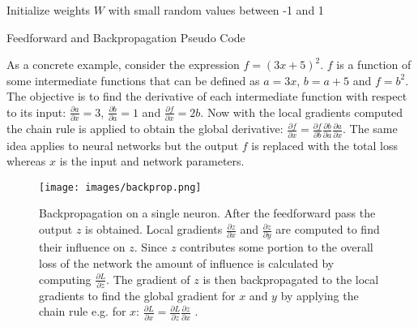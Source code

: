 \documentclass[12pt]{report}
\begin{document}
\begin{algorithm}[H]
\SetAlgoLined
 Initialize weights $W$ with small random values between -1 and 1\;
\caption{Feedforward and Backpropagation Pseudo Code}
\end{algorithm}


As a concrete example, consider the expression $f=(3x+5)^2$.  $f$ is a function of some intermediate functions that can be defined as $a=3x$, $b=a+5$ and $f=b^2$.  The objective is to find the derivative of each intermediate function with respect to its input: $\frac{\partial{a}}{\partial{x}}=3$, $\frac{\partial{b}}{\partial{a}}=1$ and $\frac{\partial{f}}{\partial{x}}=2b$.  Now with the local gradients computed the chain rule is applied to obtain the global derivative: $\frac{\partial{f}}{\partial{x}}= \frac{\partial{f}}{\partial{b}} \frac{\partial{b}}{\partial{a}} \frac{\partial{a}}{\partial{x}}$.  The same idea applies to neural networks but the output $f$ is replaced with the total loss whereas $x$ is the input and network parameters.

\begin{figure}[H]
\centering
\texttt{[image: images/backprop.png]}
\caption[Backpropagation on a single neuron] {Backpropagation on a single neuron. After the feedforward pass the output $z$ is obtained.  Local gradients $\frac{\partial{z}}{\partial{x}}$ and $\frac{\partial{z}}{\partial{y}}$ are computed to find their influence on $z$. Since $z$ contributes some portion to the overall loss of the network the amount of influence is calculated by computing $\frac{\partial{L}}{\partial{z}}$.  The gradient of $z$ is then backpropagated to the local gradients to find the global gradient for $x$ and $y$ by applying the chain rule e.g. for $x$: $\frac{\partial{L}}{\partial{x}} = \frac{\partial{L}}{\partial{z}} \frac{\partial{z}}{\partial{x}}$ \cite{cs231n}.}
\end{figure}
\end{document}
